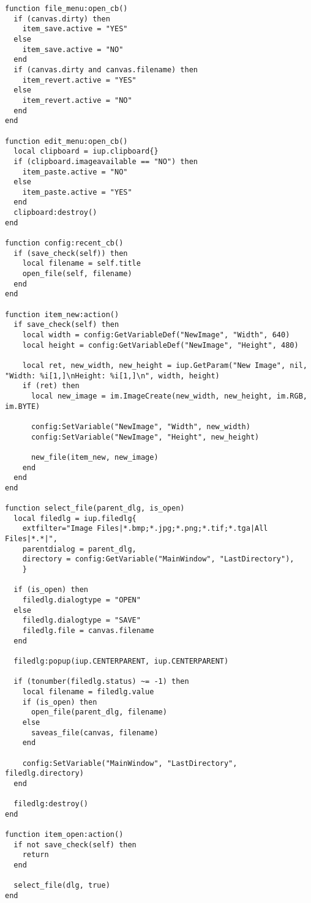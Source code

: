 \documentclass{ctexart}
\begin{document}
\begin{lstlisting}
function file_menu:open_cb()
  if (canvas.dirty) then
    item_save.active = "YES"
  else
    item_save.active = "NO"
  end
  if (canvas.dirty and canvas.filename) then
    item_revert.active = "YES"
  else
    item_revert.active = "NO"
  end
end

function edit_menu:open_cb()
  local clipboard = iup.clipboard{}
  if (clipboard.imageavailable == "NO") then
    item_paste.active = "NO"
  else
    item_paste.active = "YES"
  end
  clipboard:destroy()
end

function config:recent_cb()
  if (save_check(self)) then
    local filename = self.title
    open_file(self, filename)
  end
end

function item_new:action()
  if save_check(self) then
    local width = config:GetVariableDef("NewImage", "Width", 640)
    local height = config:GetVariableDef("NewImage", "Height", 480)

    local ret, new_width, new_height = iup.GetParam("New Image", nil, "Width: %i[1,]\nHeight: %i[1,]\n", width, height)
    if (ret) then
      local new_image = im.ImageCreate(new_width, new_height, im.RGB, im.BYTE)

      config:SetVariable("NewImage", "Width", new_width)
      config:SetVariable("NewImage", "Height", new_height)

      new_file(item_new, new_image)
    end
  end
end

function select_file(parent_dlg, is_open)
  local filedlg = iup.filedlg{
    extfilter="Image Files|*.bmp;*.jpg;*.png;*.tif;*.tga|All Files|*.*|",
    parentdialog = parent_dlg,
    directory = config:GetVariable("MainWindow", "LastDirectory"),
    }
    
  if (is_open) then
    filedlg.dialogtype = "OPEN"
  else
    filedlg.dialogtype = "SAVE"
    filedlg.file = canvas.filename
  end

  filedlg:popup(iup.CENTERPARENT, iup.CENTERPARENT)
  
  if (tonumber(filedlg.status) ~= -1) then
    local filename = filedlg.value
    if (is_open) then
      open_file(parent_dlg, filename)
    else
      saveas_file(canvas, filename)    
    end

    config:SetVariable("MainWindow", "LastDirectory", filedlg.directory)
  end
  
  filedlg:destroy()
end

function item_open:action()
  if not save_check(self) then
    return
  end

  select_file(dlg, true)
end


\end{lstlisting}
\end{document}
